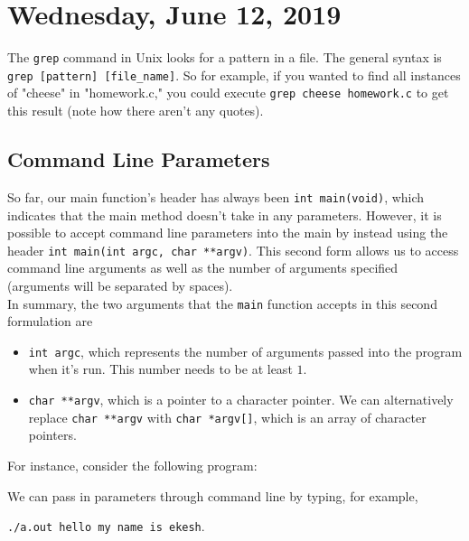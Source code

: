 \section{Wednesday, June 12, 2019}

The \verb!grep! command in Unix looks for a pattern in a file. The general syntax is \verb!grep [pattern] [file_name]!. So for example, if you wanted to find all instances of "cheese" in "homework.c," you could execute \verb!grep cheese homework.c! to get this result (note how there aren't any quotes). 

\subsection{Command Line Parameters}

So far, our main function's header has always been \texttt{int main(void)}, which indicates that the main method doesn't take in any parameters. However, it is possible to accept command line parameters into the main by instead using the header \texttt{int main(int argc, char **argv)}. This second form allows us to access command line arguments as well as the number of arguments specified (arguments will be separated by spaces). \\

In summary, the two arguments that the \texttt{main} function accepts in this second formulation are \begin{itemize}
    \item \texttt{int argc}, which represents the number of arguments passed into the program when it's run. This number needs to be at least $1$.
    \item \texttt{char **argv}, which is a pointer to a character pointer. We can alternatively replace \texttt{char **argv} with \texttt{char *argv[]}, which is an array of character pointers. 
\end{itemize}

For instance, consider the following program:  




\lstset{
caption=Command Line Parameters
}
\begin{center}
\label{Command Line Parameters}
\end{center}


We can pass in parameters through command line by typing, for example, 
\begin{center}
\texttt{./a.out hello my name is ekesh}. 
\end{center}

